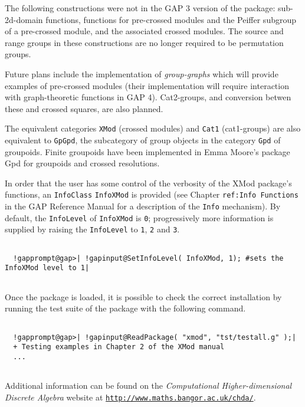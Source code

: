\documentclass[a4paper,11pt]{report}
\begin{document}
{ The following constructions were not in the \textsf{GAP} 3 version of the package: sub-2d-domain functions, functions for pre-crossed
modules and the Peiffer subgroup of a pre-crossed module, and the associated
crossed modules. The source and range groups in these constructions are no
longer required to be permutation groups. 

 Future plans include the implementation of \emph{group-graphs} which will provide examples of pre-crossed modules (their implementation will
require interaction with graph-theoretic functions in \textsf{GAP} 4). Cat2-groups, and conversion betwen these and crossed squares, are also
planned. 

 The equivalent categories \texttt{XMod} (crossed modules) and \texttt{Cat1} (cat1-groups) are also equivalent to \texttt{GpGpd}, the subcategory of group objects in the category \texttt{Gpd} of groupoids. Finite groupoids have been implemented in Emma Moore's package \textsf{Gpd} \cite{M1} for groupoids and crossed resolutions. 

  In order that the user has some control of the verbosity of the \textsf{XMod} package's functions, an \texttt{InfoClass} \texttt{InfoXMod} is provided (see Chapter \texttt{ref:Info Functions} in the \textsf{GAP} Reference Manual for a description of the \texttt{Info} mechanism). By default, the \texttt{InfoLevel} of \texttt{InfoXMod} is \texttt{0}; progressively more information is supplied by raising the \texttt{InfoLevel} to \texttt{1}, \texttt{2} and \texttt{3}. 
\begin{Verbatim}[commandchars=!@|,fontsize=\small,frame=single,label=Example]
  
  !gapprompt@gap>| !gapinput@SetInfoLevel( InfoXMod, 1); #sets the InfoXMod level to 1|
  
\end{Verbatim}
 Once the package is loaded, it is possible to check the correct installation
by running the test suite of the package with the following command. 
\begin{Verbatim}[commandchars=!@|,fontsize=\small,frame=single,label=Example]
  
  !gapprompt@gap>| !gapinput@ReadPackage( "xmod", "tst/testall.g" );|
  + Testing examples in Chapter 2 of the XMod manual
  ... 
  
\end{Verbatim}
 Additional information can be found on the \emph{Computational Higher-dimensional Discrete Algebra} website at \href{http://www.maths.bangor.ac.uk/chda/} {\texttt{http://www.maths.bangor.ac.uk/chda/}}. }
\end{document}
